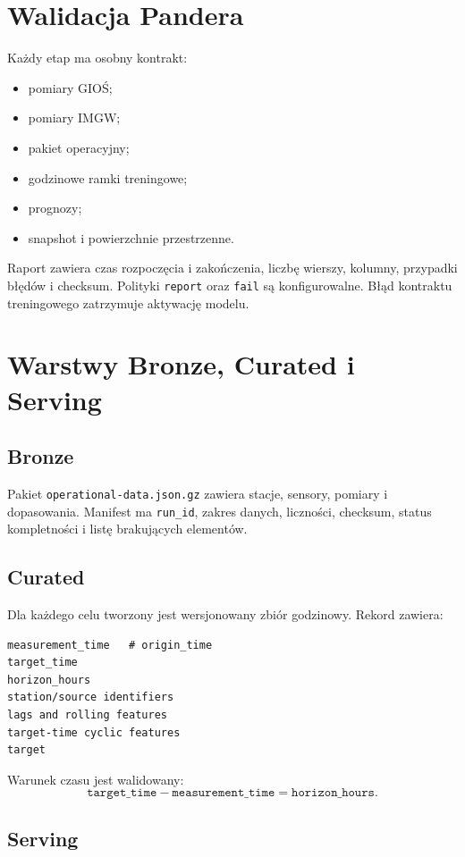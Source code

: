 \documentclass[11pt,a4paper,oneside]{article}
\begin{document}
\section{Walidacja Pandera}

Każdy etap ma osobny kontrakt:
\begin{itemize}[nosep]
  \item pomiary GIOŚ;
  \item pomiary IMGW;
  \item pakiet operacyjny;
  \item godzinowe ramki treningowe;
  \item prognozy;
  \item snapshot i powierzchnie przestrzenne.
\end{itemize}

Raport zawiera czas rozpoczęcia i zakończenia, liczbę wierszy, kolumny,
przypadki błędów i checksum. Polityki \texttt{report} oraz \texttt{fail} są
konfigurowalne. Błąd kontraktu treningowego zatrzymuje aktywację modelu.

\section{Warstwy Bronze, Curated i Serving}

\subsection{Bronze}

Pakiet \texttt{operational-data.json.gz} zawiera stacje, sensory, pomiary i
dopasowania. Manifest ma \texttt{run\_id}, zakres danych, liczności, checksum,
status kompletności i listę brakujących elementów.

\subsection{Curated}

Dla każdego celu tworzony jest wersjonowany zbiór godzinowy. Rekord zawiera:
\begin{lstlisting}[style=code]
measurement_time   # origin_time
target_time
horizon_hours
station/source identifiers
lags and rolling features
target-time cyclic features
target
\end{lstlisting}

Warunek czasu jest walidowany:
\[
  \texttt{target\_time}-\texttt{measurement\_time}
  =\texttt{horizon\_hours}.
\]

\subsection{Serving}
\end{document}
